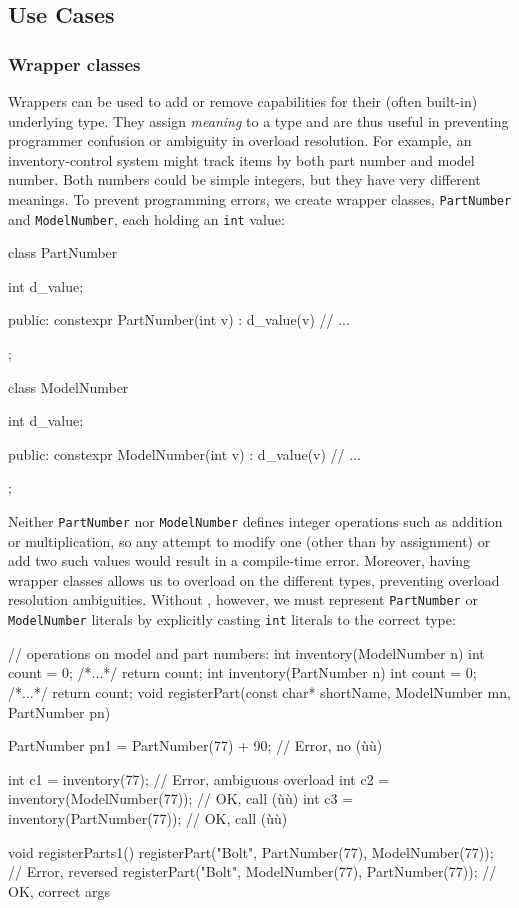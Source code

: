 \subsection[Use Cases]{Use Cases}\label{use-cases-userdeflit}

\subsubsection[Wrapper classes]{Wrapper classes}\label{wrapper-classes}

Wrappers can be used to add or remove capabilities for their (often
built-in) underlying type. They assign \emph{meaning} to a type and are
thus useful in preventing programmer confusion or ambiguity in overload
resolution. For example, an inventory-control system might track items
by both part number and model number. Both numbers could be simple
integers, but they have very different meanings. To prevent programming
errors, we create wrapper classes, \lstinline!PartNumber! and
\lstinline!ModelNumber!, each holding an \lstinline!int! value:

\begin{emcppslisting}[emcppsbatch=e14]
class PartNumber
{
    int d_value;

public:
    constexpr PartNumber(int v) : d_value(v) { }
    // ...
};

class ModelNumber
{
    int d_value;

public:
    constexpr ModelNumber(int v) : d_value(v) { }
    // ...
};
\end{emcppslisting}
    
\noindent Neither \lstinline!PartNumber! nor \lstinline!ModelNumber! defines integer
operations such as addition or multiplication, so any attempt to modify
one (other than by assignment) or add two such values would result in a
compile-time error. Moreover, having wrapper classes allows us to
overload on the different types, preventing overload resolution
ambiguities. Without , however, we must represent
\lstinline!PartNumber! or \lstinline!ModelNumber! literals by explicitly
casting \lstinline!int! literals to the correct type:

\begin{emcppslisting}[emcppsbatch=e14]
// operations on model and part numbers:
int inventory(ModelNumber n) { int count = 0; /*...*/ return count; }
int inventory(PartNumber n)  { int count = 0; /*...*/ return count; }
void registerPart(const char* shortName, ModelNumber mn, PartNumber pn) { }

PartNumber pn1 = PartNumber(77) + 90;  // Error, no (ù{}ù)

int c1 = inventory(77);               // Error, ambiguous overload
int c2 = inventory(ModelNumber(77));  // OK, call (ù{}ù)
int c3 = inventory(PartNumber(77));   // OK, call (ù{}ù)

void registerParts1()
{
    registerPart("Bolt", PartNumber(77), ModelNumber(77));  // Error, reversed
    registerPart("Bolt", ModelNumber(77), PartNumber(77));  // OK, correct args
}
\end{emcppslisting}
    

